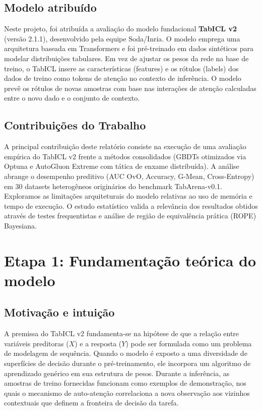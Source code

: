 \documentclass[12pt,a4paper]{article}
\begin{document}
\subsection{Modelo atribuído}
Neste projeto, foi atribuída a avaliação do modelo fundacional \textbf{TabICL v2} (versão 2.1.1), desenvolvido pela equipe Soda/Inria. O modelo emprega uma arquitetura baseada em Transformers e foi pré-treinado em dados sintéticos para modelar distribuições tabulares. Em vez de ajustar os pesos da rede na base de treino, o TabICL insere as características (features) e os rótulos (labels) dos dados de treino como tokens de atenção no contexto de inferência. O modelo prevê os rótulos de novas amostras com base nas interações de atenção calculadas entre o novo dado e o conjunto de contexto.

\subsection{Contribuições do Trabalho}
A principal contribuição deste relatório consiste na execução de uma avaliação empírica do TabICL v2 frente a métodos consolidados (GBDTs otimizados via Optuna e AutoGluon Extreme com tática de enxame distribuída). A análise abrange o desempenho preditivo (AUC OvO, Accuracy, G-Mean, Cross-Entropy) em 30 datasets heterogêneos originários do benchmark TabArena-v0.1. Exploramos as limitações arquiteturais do modelo relativas ao uso de memória e tempo de execução. O estudo estatístico valida a relevância dos resultados obtidos através de testes frequentistas e análise de região de equivalência prática (ROPE) Bayesiana.

\section*{Etapa 1: Fundamentação teórica do modelo}

\subsection{Motivação e intuição}
A premissa do TabICL v2 fundamenta-se na hipótese de que a relação entre variáveis preditoras ($X$) e a resposta ($Y$) pode ser formulada como um problema de modelagem de sequência. Quando o modelo é exposto a uma diversidade de superfícies de decisão durante o pré-treinamento, ele incorpora um algoritmo de aprendizado genérico em sua estrutura de pesos. Durante a inferência, as amostras de treino fornecidas funcionam como exemplos de demonstração, nos quais o mecanismo de auto-atenção correlaciona a nova observação aos vizinhos contextuais que definem a fronteira de decisão da tarefa.
\end{document}
